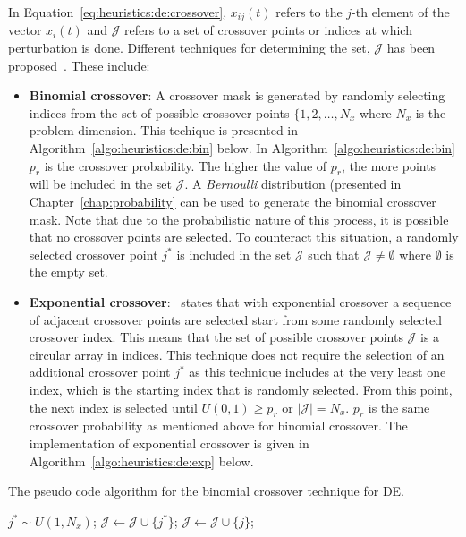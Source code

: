 In Equation~\eqref{eq:heuristics:de:crossover}, $x_{ij}(t)$ refers to the $j$-th element of the vector $x_{i}(t)$ and $\mathcal{J}$ refers to a set of crossover points or indices at which perturbation is done. Different techniques for determining the set, $\mathcal{J}$ has been proposed~\cite{ref:storn:1996}\cite{ref:storn:1997}. These include:

\begin{itemize}
      \item \textbf{Binomial crossover}: A crossover mask is generated by randomly selecting indices from the set of possible crossover points $\{1,2,\dots,N_{x}$ where $N_{x}$ is the problem dimension. This techique is presented in Algorithm~\ref{algo:heuristics:de:bin} below. In Algorithm~\ref{algo:heuristics:de:bin} $p_{r}$ is the crossover probability. The higher the value of $p_{r}$, the more points will be included in the set $\mathcal{J}$. A \textit{Bernoulli} distribution (presented in Chapter~\ref{chap:probability} can be used to generate the binomial crossover mask. Note that due to the probabilistic nature of this process, it is possible that no crossover points are selected. To counteract this situation, a randomly selected crossover point $j^{*}$ is included in the set $\mathcal{J}$ such that $\mathcal{J} \neq \emptyset$ where $\emptyset$ is the empty set.
      \item \textbf{Exponential crossover}:~\citeauthor{ref:engelbrecht:2007}\cite{ref:engelbrecht:2007} states that with exponential crossover a sequence of adjacent crossover points are selected start from some randomly selected crossover index. This means that the set of possible crossover points $\mathcal{J}$ is a circular array in indices. This technique does not require the selection of an additional crossover point $j^{*}$ as this technique includes at the very least one index, which is the starting index that is randomly selected. From this point, the next index is selected until $U(0,1) \geq p_{r}$ or $|\mathcal{J}| = N_{x}$. $p_{r}$ is the same crossover probability as mentioned above for binomial crossover. The implementation of exponential crossover is given in Algorithm~\ref{algo:heuristics:de:exp} below.
\end{itemize}

\begin{algorithm}[H]
      \caption{The pseudo code algorithm for the binomial crossover technique for \acs{DE}.}
      \label{algo:heuristics:de:bin}
      \begin{algorithmic}
            \State $j^{*} \sim U(1,N_{x})$;
            \State $\mathcal{J} \gets \mathcal{J} \cup \{j^{*}\}$;
            \State $\mathcal{J} \gets \mathcal{J} \cup \{j\}$;
            \EndIf
            \EndFor
      \end{algorithmic}
\end{algorithm}

